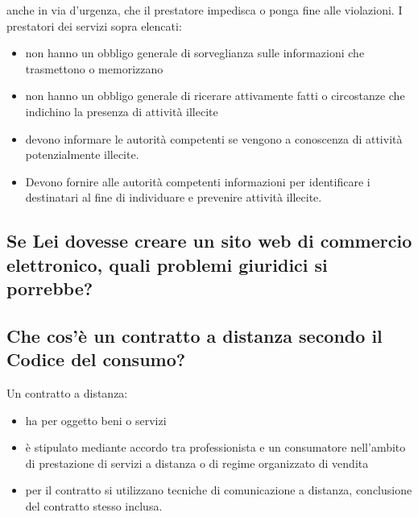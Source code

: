 anche in via d'urgenza, che il prestatore impedisca o ponga fine alle violazioni.
\newline
I prestatori dei servizi sopra elencati:
\begin{itemize}
    \item non hanno un obbligo generale di sorveglianza sulle informazioni che trasmettono o memorizzano
    \item non hanno un obbligo generale di ricerare attivamente fatti o circostanze che
        indichino la presenza di attività illecite
    \item devono informare le autorità competenti se vengono a conoscenza di attività
        potenzialmente illecite.
    \item Devono fornire alle autorità competenti informazioni per identificare i
        destinatari al fine di individuare e prevenire attività illecite.
\end{itemize}

\subsection{Se Lei dovesse creare un sito web di commercio elettronico, quali problemi giuridici si porrebbe?}

\subsection{Che cos'è un contratto a distanza secondo il Codice del consumo?}
Un contratto a distanza:
\begin{itemize}
    \item ha per oggetto beni o servizi
    \item è stipulato mediante accordo tra professionista e un consumatore nell'ambito di
        prestazione di servizi a distanza o di regime organizzato di vendita
    \item per il contratto si utilizzano tecniche di comunicazione a distanza, conclusione
        del contratto stesso inclusa.
\end{itemize}

